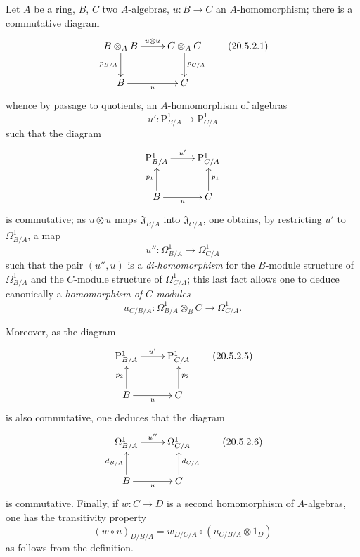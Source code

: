 \begin{env}[20.5.2]
\label{0.20.5.2}
Let $A$ be a ring, $B$, $C$ two $A$-algebras, $u:B\to C$ an $A$-homomorphism; there is a commutative diagram
\[
\xymatrix{
  B\otimes_A B \ar[r]^{u\otimes u} \ar[d]_{p_{B/A}} & C\otimes_A C \ar[d]^{p_{C/A}} \\
  B \ar[r]_u & C
}
\tag{20.5.2.1}
  \label{0.20.5.2.1}
\]
whence by passage to quotients, an $A$-homomorphism of algebras
\begin{equation}
\tag{20.5.2.2}
  \label{0.20.5.2.2}
  u':\mathrm{P}^1_{B/A}\to\mathrm{P}^1_{C/A}
\end{equation}
such that the diagram
\[
\xymatrix{
  \mathrm{P}^1_{B/A} \ar[r]^{u'} & \mathrm{P}^1_{C/A} \\
  B \ar[u]^{p_1} \ar[r]_u & C \ar[u]_{p_1}
}
\]
is commutative; as $u\otimes u$ maps $\mathfrak{J}_{B/A}$ into $\mathfrak{J}_{C/A}$, one obtains, by restricting $u'$ to $\Omega^1_{B/A}$, a map
\begin{equation}
\tag{20.5.2.3}
  \label{0.20.5.2.3}
  u'':\Omega^1_{B/A}\to\Omega^1_{C/A}
\end{equation}
such that the pair $(u'',u)$ is a \emph{di-homomorphism} for the $B$-module structure of $\Omega^1_{B/A}$ and the $C$-module structure of $\Omega^1_{C/A}$; this last fact allows one to deduce canonically a \emph{homomorphism of $C$-modules}
\begin{equation}
\tag{20.5.2.4}
  \label{0.20.5.2.4}
  u_{C/B/A}:\Omega^1_{B/A}\otimes_B C\to\Omega^1_{C/A}.
\end{equation}

Moreover, as the diagram
\[
\xymatrix{
  \mathrm{P}^1_{B/A} \ar[r]^{u'} & \mathrm{P}^1_{C/A} \\
  B \ar[u]^{p_2} \ar[r]_u & C \ar[u]_{p_2}
}
\tag{20.5.2.5}
  \label{0.20.5.2.5}
\]
is also commutative, one deduces that the diagram
\[
\xymatrix{
  \Omega^1_{B/A} \ar[r]^{u''} & \Omega^1_{C/A} \\
  B \ar[u]^{d_{B/A}} \ar[r]_u & C \ar[u]_{d_{C/A}}
}
\tag{20.5.2.6}
  \label{0.20.5.2.6}
\]
is commutative.
Finally, if $w:C\to D$ is a second homomorphism of $A$-algebras, one has the transitivity property
\begin{equation}
\tag{20.5.2.7}
  \label{0.20.5.2.7}
  (w\circ u)_{D/B/A} = w_{D/C/A}\circ(u_{C/B/A}\otimes1_D)
\end{equation}
as follows from the definition.
\end{env}

